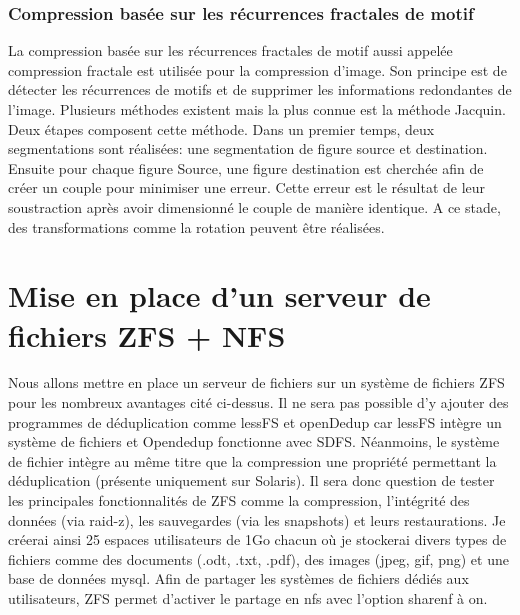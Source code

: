 \documentclass[a4paper]{report}
\begin{document}
	\subsection{Compression basée sur les récurrences fractales de motif}
		La compression basée sur les récurrences fractales de motif aussi appelée compression fractale est utilisée pour la compression d'image. Son principe est de détecter les récurrences de motifs et de supprimer les informations redondantes de l'image. Plusieurs méthodes existent mais la plus connue est la méthode Jacquin. Deux étapes composent cette méthode. Dans un premier temps, deux segmentations sont réalisées: une segmentation de figure source et destination. Ensuite pour chaque figure Source, une figure destination est cherchée afin de créer un couple pour minimiser une erreur. Cette erreur est le résultat de leur soustraction après avoir dimensionné le couple de manière identique. A ce stade, des transformations comme la rotation peuvent être réalisées.
		
         \chapter{Mise en place d'un serveur de fichiers ZFS + NFS}
		Nous allons mettre en place un serveur de fichiers sur un système de fichiers ZFS pour les nombreux avantages cité ci-dessus. Il ne sera pas possible d'y ajouter des programmes de déduplication comme lessFS et openDedup car lessFS intègre un système de fichiers et Opendedup fonctionne avec SDFS. Néanmoins, le système de fichier intègre au même titre que la compression une propriété permettant la déduplication (présente uniquement sur Solaris). Il sera donc question de tester les principales fonctionnalités de ZFS comme la compression, l'intégrité des données (via raid-z), les sauvegardes (via les snapshots) et leurs restaurations. Je créerai ainsi 25 espaces utilisateurs de 1Go chacun où je stockerai divers types de fichiers comme des documents (.odt, .txt, .pdf), des images (jpeg, gif, png) et une base de données mysql. Afin de partager les systèmes de fichiers dédiés aux utilisateurs, ZFS permet d'activer le partage en nfs avec l'option sharenf à on.
\end{document}
